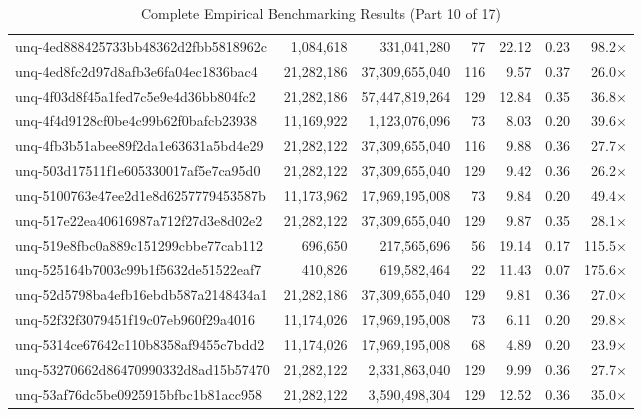 \begin{table}[h!]
\begin{tabular}{lrrrrrr}
unq-4ed888425733bb48362d2fbb5818962c & 1,084,618 & 331,041,280 & 77 & 22.12 & 0.23 & 98.2$\times$ \\
unq-4ed8fc2d97d8afb3e6fa04ec1836bac4 & 21,282,186 & 37,309,655,040 & 116 & 9.57 & 0.37 & 26.0$\times$ \\
unq-4f03d8f45a1fed7c5e9e4d36bb804fc2 & 21,282,186 & 57,447,819,264 & 129 & 12.84 & 0.35 & 36.8$\times$ \\
unq-4f4d9128cf0be4c99b62f0bafcb23938 & 11,169,922 & 1,123,076,096 & 73 & 8.03 & 0.20 & 39.6$\times$ \\
unq-4fb3b51abee89f2da1e63631a5bd4e29 & 21,282,122 & 37,309,655,040 & 116 & 9.88 & 0.36 & 27.7$\times$ \\
unq-503d17511f1e605330017af5e7ca95d0 & 21,282,122 & 37,309,655,040 & 129 & 9.42 & 0.36 & 26.2$\times$ \\
unq-5100763e47ee2d1e8d6257779453587b & 11,173,962 & 17,969,195,008 & 73 & 9.84 & 0.20 & 49.4$\times$ \\
unq-517e22ea40616987a712f27d3e8d02e2 & 21,282,122 & 37,309,655,040 & 129 & 9.87 & 0.35 & 28.1$\times$ \\
unq-519e8fbc0a889c151299cbbe77cab112 & 696,650 & 217,565,696 & 56 & 19.14 & 0.17 & 115.5$\times$ \\
unq-525164b7003c99b1f5632de51522eaf7 & 410,826 & 619,582,464 & 22 & 11.43 & 0.07 & 175.6$\times$ \\
unq-52d5798ba4efb16ebdb587a2148434a1 & 21,282,186 & 37,309,655,040 & 129 & 9.81 & 0.36 & 27.0$\times$ \\
unq-52f32f3079451f19c07eb960f29a4016 & 11,174,026 & 17,969,195,008 & 73 & 6.11 & 0.20 & 29.8$\times$ \\
unq-5314ce67642c110b8358af9455c7bdd2 & 11,174,026 & 17,969,195,008 & 68 & 4.89 & 0.20 & 23.9$\times$ \\
unq-53270662d86470990332d8ad15b57470 & 21,282,122 & 2,331,863,040 & 129 & 9.99 & 0.36 & 27.7$\times$ \\
unq-53af76dc5be0925915bfbc1b81acc958 & 21,282,122 & 3,590,498,304 & 129 & 12.52 & 0.36 & 35.0$\times$ \\
\bottomrule
\end{tabular}
\caption{Complete Empirical Benchmarking Results (Part 10 of 17)}
\end{table}

\clearpage

